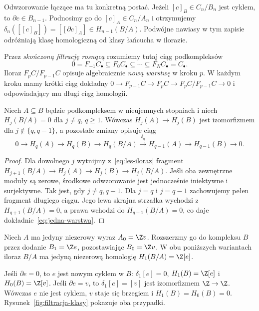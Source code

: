 Odwzorowanie łączące ma tu konkretną postać. Jeżeli
$[c]_B\in C_n/B_n$ jest cyklem, to $\partial c\in B_{n-1}$.
Podnosimy go do $[c]_A\in C_n/A_n$ i otrzymujemy
$\delta_n([[c]_B])=[[\partial c]_A]\in H_{n-1}(B/A)$.
Podwójne nawiasy w tym zapisie odróżniają klasę
homologiczną od klasy łańcucha w ilorazie.

\begin{definicja}
\label{def:filtracja-kompleksu}
Przez \emph{skończoną filtrację rosnącą} rozumiemy tutaj ciąg
podkompleksów
\[
 0=F_{-1}C_\bullet\subseteq
 F_0C_\bullet\subseteq\cdots\subseteq
 F_NC_\bullet=C_\bullet.
\]
Iloraz $F_pC/F_{p-1}C$ opisuje
algebraicznie \emph{nową warstwę}
w kroku $p$. W każdym kroku mamy
krótki ciąg dokładny
$0\to F_{p-1}C\to F_pC\to
F_pC/F_{p-1}C\to0$
i odpowiadający mu długi ciąg homologii.
\end{definicja}

\begin{wniosek}
\label{wn:filtracja-jeden-stopien}
Niech $A\subseteq B$ będzie podkompleksem
w nieujemnych stopniach i niech
$H_j(B/A)=0$ dla $j\ne q$, $q\geq1$.
Wówczas $H_j(A)\to H_j(B)$ jest
izomorfizmem dla $j\notin\{q,q-1\}$,
a pozostałe zmiany opisuje ciąg
\begin{equation}\label{eq:jedna-warstwa}
 0\to H_q(A)\to H_q(B)\to H_q(B/A)
 \xrightarrow{\delta_q}H_{q-1}(A)
 \to H_{q-1}(B)\to0.
\end{equation}
\end{wniosek}
\begin{proof}
Dla dowolnego $j$ wytnijmy z~\eqref{eq:les-iloraz}
fragment $H_{j+1}(B/A)\to H_j(A)\to H_j(B)\to H_j(B/A)$.
Jeśli oba zewnętrzne moduły są zerowe,
środkowe odwzorowanie jest jednocześnie
iniektywne i surjektywne.
Tak jest, gdy $j\ne q,q-1$.
Dla $j=q$ i $j=q-1$ zachowujemy
pełen fragment długiego ciągu.
Jego lewa skrajna strzałka wychodzi
z $H_{q+1}(B/A)=0$, a prawa
wchodzi do $H_{q-1}(B/A)=0$,
co daje dokładnie~\eqref{eq:jedna-warstwa}.
\end{proof}

\begin{przyklad}
Niech $A$ ma jedyny niezerowy wyraz $A_0=\Z v$.
Rozszerzmy go do kompleksu $B$ przez dodanie
$B_1=\Z e$, pozostawiając $B_0=\Z v$.
W obu poniższych wariantach iloraz $B/A$
ma jedyną niezerową homologię
$H_1(B/A)=\Z[e]$.

Jeśli $\partial e=0$, to $e$ jest nowym cyklem w $B$:
$\delta_1[e]=0$, $H_1(B)=\Z[e]$ i $H_0(B)=\Z[v]$.
Jeśli $\partial e=v$, to $\delta_1[e]=[v]$ jest
izomorfizmem $\Z\to\Z$. Wówczas $e$ nie jest cyklem,
$v$ staje się brzegiem i $H_1(B)=H_0(B)=0$.
Rysunek~\ref{fig:filtracja-klasy} pokazuje oba przypadki.
\end{przyklad}

